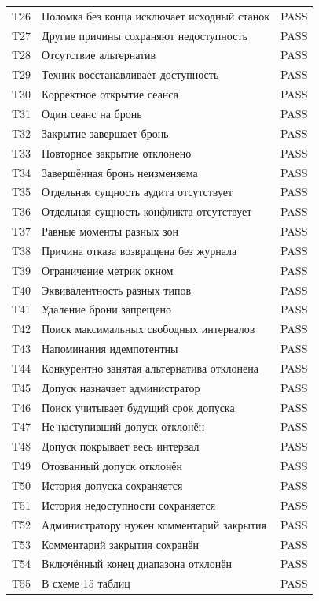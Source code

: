 \begin{singlespace}
\begin{longtable}{>{\raggedright\arraybackslash}p{}>{\raggedright\arraybackslash}p{}>{\raggedright\arraybackslash}p{}}
T26 & Поломка без конца исключает исходный станок & PASS \\
T27 & Другие причины сохраняют недоступность & PASS \\
T28 & Отсутствие альтернатив & PASS \\
T29 & Техник восстанавливает доступность & PASS \\
T30 & Корректное открытие сеанса & PASS \\
T31 & Один сеанс на бронь & PASS \\
T32 & Закрытие завершает бронь & PASS \\
T33 & Повторное закрытие отклонено & PASS \\
T34 & Завершённая бронь неизменяема & PASS \\
T35 & Отдельная сущность аудита отсутствует & PASS \\
T36 & Отдельная сущность конфликта отсутствует & PASS \\
T37 & Равные моменты разных зон & PASS \\
T38 & Причина отказа возвращена без журнала & PASS \\
T39 & Ограничение метрик окном & PASS \\
T40 & Эквивалентность разных типов & PASS \\
T41 & Удаление брони запрещено & PASS \\
T42 & Поиск максимальных свободных интервалов & PASS \\
T43 & Напоминания идемпотентны & PASS \\
T44 & Конкурентно занятая альтернатива отклонена & PASS \\
T45 & Допуск назначает администратор & PASS \\
T46 & Поиск учитывает будущий срок допуска & PASS \\
T47 & Не наступивший допуск отклонён & PASS \\
T48 & Допуск покрывает весь интервал & PASS \\
T49 & Отозванный допуск отклонён & PASS \\
T50 & История допуска сохраняется & PASS \\
T51 & История недоступности сохраняется & PASS \\
T52 & Администратору нужен комментарий закрытия & PASS \\
T53 & Комментарий закрытия сохранён & PASS \\
T54 & Включённый конец диапазона отклонён & PASS \\
T55 & В схеме 15 таблиц & PASS \\

\end{longtable}
\end{singlespace}
